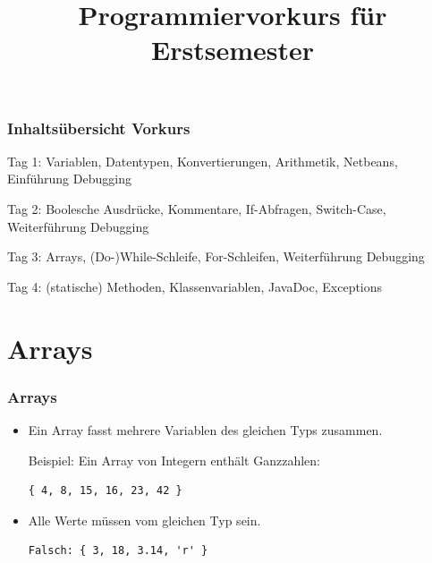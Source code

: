 \documentclass[final]{beamer}
\title{Programmiervorkurs für Erstsemester}
\begin{document}


\begin{frame}
	\titlepage
\end{frame}

\begin{frame}
	\frametitle{Inhaltsübersicht Vorkurs}
	\begin{itemize}
	{\color{gray}
		\item {Tag 1: Variablen, Datentypen, Konvertierungen, Arithmetik, Netbeans, Einführung Debugging}
		\item {Tag 2: Boolesche Ausdrücke, Kommentare, If-Abfragen, Switch-Case, Weiterführung Debugging}
		{\color{black}
		\item {Tag 3: Arrays, (Do-)While-Schleife, For-Schleifen, Weiterführung Debugging}
		}
		\item {Tag 4: (statische) Methoden, Klassenvariablen, JavaDoc, Exceptions}
	}
	\end{itemize}
\end{frame}

\section{Arrays}
\begin{frame}[containsverbatim]
	\frametitle{Arrays}
	\begin{itemize}
	\item{Ein Array fasst mehrere Variablen des gleichen Typs zusammen.

	Beispiel: Ein Array von Integern enthält Ganzzahlen:}
		\begin{lstlisting}
{ 4, 8, 15, 16, 23, 42 } 
		\end{lstlisting}
	\item{Alle Werte müssen vom gleichen Typ sein.}
		\begin{lstlisting}
Falsch: { 3, 18, 3.14, 'r' }
		\end{lstlisting}
	\end{itemize}
\end{frame}
\end{document}
